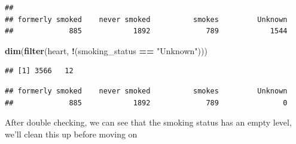 \documentclass[
]{book}
\newenvironment{Shaded}{\begin{snugshade}}{\end{snugshade}}
\newcommand{\CommentTok}[1]{\textcolor[rgb]{0.56,0.35,0.01}{\textit{#1}}}
\newcommand{\FunctionTok}[1]{\textcolor[rgb]{0.13,0.29,0.53}{\textbf{#1}}}
\newcommand{\NormalTok}[1]{#1}
\newcommand{\OtherTok}[1]{\textcolor[rgb]{0.56,0.35,0.01}{#1}}
\newcommand{\SpecialCharTok}[1]{\textcolor[rgb]{0.81,0.36,0.00}{\textbf{#1}}}
\newcommand{\StringTok}[1]{\textcolor[rgb]{0.31,0.60,0.02}{#1}}
\begin{document}
\begin{Shaded}
\end{Shaded}

\begin{verbatim}
## 
## formerly smoked    never smoked          smokes         Unknown 
##             885            1892             789            1544
\end{verbatim}

\begin{Shaded}
\begin{Highlighting}[]
\FunctionTok{dim}\NormalTok{(}\FunctionTok{filter}\NormalTok{(heart, }\SpecialCharTok{!}\NormalTok{(smoking\_status }\SpecialCharTok{==} \StringTok{"Unknown"}\NormalTok{)))}
\end{Highlighting}
\end{Shaded}

\begin{verbatim}
## [1] 3566   12
\end{verbatim}

\begin{Shaded}
\end{Shaded}

\begin{verbatim}
## formerly smoked    never smoked          smokes         Unknown 
##             885            1892             789               0
\end{verbatim}

After double checking, we can see that the smoking status has an empty level, we'll clean this up before moving on

\begin{Shaded}
\end{Shaded}
\end{document}
